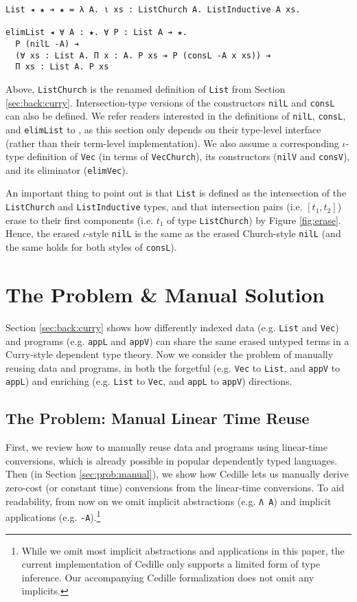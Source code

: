 \documentclass[acmsmall]{acmart}\settopmatter{}
\newcommand{\refsec}[1]{Section \ref{sec:#1}}
\newcommand{\labsec}[1]{\label{sec:#1}}
\newcommand{\reffig}[1]{Figure \ref{fig:#1}}
\begin{document}
\begin{verbatim}
List ◂ ★ ➔ ★ = λ A. ι xs : ListChurch A. ListInductive A xs.

elimList ◂ ∀ A : ★. ∀ P : List A ➔ ★.
  P (nilL -A) ➔
  (∀ xs : List A. Π x : A. P xs ➔ P (consL -A x xs)) ➔
  Π xs : List A. P xs
\end{verbatim}
Above, \verb;ListChurch; is the renamed definition of \verb;List; from
\refsec{back:curry}. Intersection-type versions of the constructors
\verb;nilL; and \verb;consL; can also be defined. We refer readers interested
in the definitions of \verb;nilL;, \verb;consL;, and \verb;elimList;
to \citet{stump18}, as this section only depends on their
type-level interface (rather than their term-level implementation). We
also assume a corresponding $\iota$-type definition of \verb;Vec;
(in terms of \verb;VecChurch;), its constructors (\verb;nilV; and
\verb;consV;), and its eliminator (\verb;elimVec;).

An important thing to point out is that \verb;List; is
defined as the intersection of the \verb;ListChurch; and
\verb;ListInductive; types, and that intersection pairs (i.e. $[t_1,t_2]$) erase to their
first components (i.e. $t_1$ of type \verb;ListChurch;) by \reffig{erase}.
Hence, the erased $\iota$-style \verb;nilL; is the same as the erased
Church-style \verb;nilL; (and the same holds for both styles of
\verb;consL;).

\section{The Problem \& Manual Solution}
\labsec{prob}

\refsec{back:curry} shows how differently indexed data
(e.g. \verb;List; and \verb;Vec;) and programs
(e.g. \verb;appL; and \verb;appV;) can share the same erased
untyped terms in a Curry-style dependent type theory. 
Now we consider the problem of manually reusing data and programs,
in both the forgetful (e.g. \verb;Vec; to \verb;List;, and
\verb;appV; to \verb;appL;) and enriching
(e.g. \verb;List; to \verb;Vec;, and
\verb;appL; to \verb;appV;) directions.

\subsection{The Problem: Manual Linear Time Reuse}
\labsec{prob:linear}

First, we review how to manually reuse data and programs using
linear-time conversions, which is already possible in popular dependently
typed languages. Then (in \refsec{prob:manual}),
we show how Cedille lets us manually derive
zero-cost (or constant time) conversions from the linear-time
conversions. To aid readability, from now on we omit implicit
abstractions (e.g. \verb;Λ A;) and implicit applications
(e.g. \verb;-A;).\footnote{
  While we omit most implicit abstractions and applications in this
  paper, the current implementation of Cedille only supports a limited
  form of type inference. Our accompanying Cedille formalization does
  not omit any implicits.
  }
\end{document}
